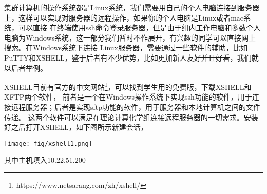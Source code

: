 \documentclass{article}
\numberwithin{equation}{section}
\begin{document}
    集群计算机的操作系统都是Linux系统，我们需要用自己的个人电脑连接到服务器上，这样可以实现对服务器的远程操作，如果你的个人电脑是Linux或者mac系统，可以直接
    在终端使用ssh命令登录服务器，但是由于组内工作电脑和多数个人电脑为Windows系统，这一部分我们暂时不作展开，有兴趣的同学可以直接网上搜索。在Windows系统下连接
    Linux服务器，需要通过一些软件的辅助，比如PuTTY和XSHELL，鉴于后者有不少优势，比如更加新人友好\sout{并且好看}，我们就以后者举例。

    XSHELL目前有官方的中文网站\footnote{https://www.netsarang.com/zh/xshell/}，可以找到学生用的免费版，下载XSHELL和XFTP两个软件，
    前者是一个在Windows操作系统下实现ssh功能的软件，用于连接远程服务器；后者是实现sftp功能的软件，用于服务器和本地计算机之间的文件传递。
    这两个软件可以满足在理论计算化学组连接远程服务器的一切需求。安装好之后打开XSHELL，如下图所示新建会话，
    \begin{center}
      \texttt{[image: fig/xshell1.png]}
    \end{center}
    其中主机填入10.22.51.200
\end{document}
